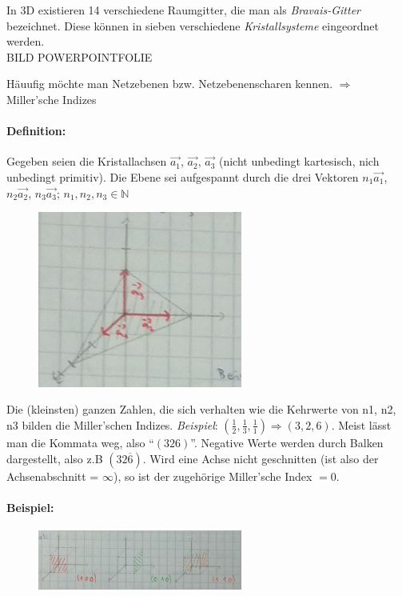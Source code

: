 \documentclass[paper=A4,12pt,pagesize,twoside,BCOR=8mm,ngerman]{scrartcl}
\begin{document}
			In 3D existieren 14 verschiedene Raumgitter, die man als 
			\emph{Bravais-Gitter} bezeichnet. Diese können in sieben 
			verschiedene \emph{Kristallsysteme} 
			eingeordnet werden.\\
			
			BILD POWERPOINTFOLIE\\


			Häuufig möchte man Netzebenen bzw. Netzebenenscharen kennen.
			$\Rightarrow$ Miller'sche Indizes
			
			\paragraph*{Definition:} Gegeben seien die Kristallachsen 
			$\vec{a_1}$, $\vec{a_2}$, $\vec{a_3}$ (nicht unbedingt 
			kartesisch, nich unbedingt primitiv). Die Ebene sei 
			aufgespannt durch die drei Vektoren $n_{1}\vec{a_1}$, 
			$n_{2}\vec{a_2}$, $n_{3}\vec{a_3}$; $n_{1}, n_{2}, n_{3} 
			\in \mathbb{N}$
			\begin{figure}[H]
				\centering
				\includegraphics[width=0.6\textwidth]{pics/pic006.jpg}
			\end{figure}
			Die (kleinsten) ganzen Zahlen, die sich verhalten wie die 
			Kehrwerte von n1, n2, n3 bilden die Miller'schen Indizes.
			\emph{Beispiel}: $\left( \frac{1}{2}, \frac{1}{3}, 
			\frac{1}{1} \right) \Rightarrow (3,2,6)$. Meist lässt man 
			die Kommata weg, also "`$(326)$"'. Negative Werte werden 
			durch Balken dargestellt, also z.B $(32\overline{6})$. Wird 
			eine Achse nicht geschnitten (ist also der Achsenabschnitt 
			= $\infty$), so ist der zugehörige Miller'sche Index $=0$.
			\paragraph*{Beispiel:} 
				\begin{figure}[H]
					\centering
					\includegraphics[width=0.6\textwidth]{pics/pic007.jpg}
				\end{figure}
			
\end{document}
